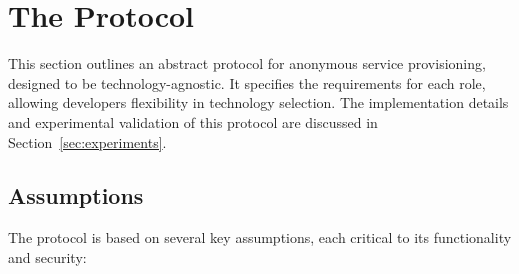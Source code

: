 \documentclass[pdftex,twocolumn,epjc3]{svjour3}
\begin{document}
\section{The Protocol}\label{sec:protocol}
This section outlines an abstract protocol for anonymous service provisioning, designed to be technology-agnostic. It specifies the requirements for each role, allowing developers flexibility in technology selection. The implementation details and experimental validation of this protocol are discussed in Section~\ref{sec:experiments}.

\subsection{Assumptions}
The protocol is based on several key assumptions, each critical to its functionality and security:
\end{document}
